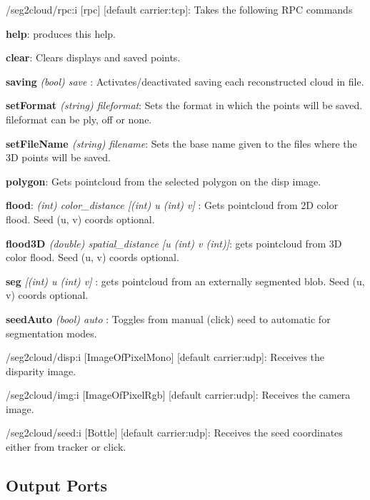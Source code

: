 \begin{DoxyItemize}
\item /seg2cloud/rpc\+:i \mbox{[}rpc\mbox{]} \mbox{[}default carrier\+:tcp\mbox{]}\+: Takes the following R\+PC commands
\begin{DoxyEnumerate}
\item {\bfseries{help}}\+: produces this help.
\item {\bfseries{clear}}\+: Clears displays and saved points.
\item {\bfseries{saving}} {\itshape (bool) save }\+: Activates/deactivated saving each reconstructed cloud in file.
\item {\bfseries{set\+Format }} {\itshape (string) fileformat}\+: Sets the format in which the points will be saved. \textquotesingle{}fileformat\textquotesingle{} can be \textquotesingle{}ply\textquotesingle{}, \textquotesingle{}off\textquotesingle{} or \textquotesingle{}none\textquotesingle{}.
\item {\bfseries{set\+File\+Name }} {\itshape  (string) filename}\+: Sets the base name given to the files where the 3D points will be saved.
\item {\bfseries{polygon}}\+: Gets pointcloud from the selected polygon on the disp image.
\item {\bfseries{flood}}\+: {\itshape  (int) color\+\_\+distance \mbox{[}(int) u (int) v\mbox{]} }\+: Gets pointcloud from 2D color flood. Seed (u, v) coords optional.
\item {\bfseries{flood3D }} {\itshape  (double) spatial\+\_\+distance \mbox{[}u (int) v (int)\mbox{]}}\+: gets pointcloud from 3D color flood. Seed (u, v) coords optional.
\item {\bfseries{seg}} {\itshape  \mbox{[}(int) u (int) v\mbox{]} }\+: gets pointcloud from an externally segmented blob. Seed (u, v) coords optional.
\item {\bfseries{seed\+Auto}} {\itshape (bool) auto }\+: Toggles from manual (click) seed to \textquotesingle{}automatic\textquotesingle{} for segmentation modes.
\end{DoxyEnumerate}
\item /seg2cloud/disp\+:i \mbox{[}Image\+Of\+Pixel\+Mono\mbox{]} \mbox{[}default carrier\+:udp\mbox{]}\+: Receives the disparity image.
\item /seg2cloud/img\+:i \mbox{[}Image\+Of\+Pixel\+Rgb\mbox{]} \mbox{[}default carrier\+:udp\mbox{]}\+: Receives the camera image.
\item /seg2cloud/seed\+:i \mbox{[}Bottle\mbox{]} \mbox{[}default carrier\+:udp\mbox{]}\+: Receives the seed coordinates either from tracker or click.
\end{DoxyItemize}\hypertarget{group__seg2cloud_outputports_sec}{}\subsection{Output Ports}\label{group__seg2cloud_outputports_sec}

